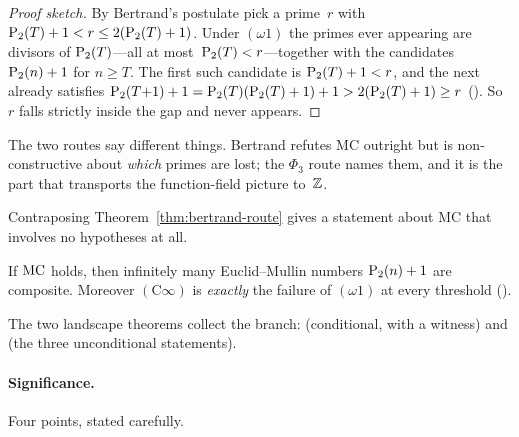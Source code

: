 \begin{proof}[Proof sketch]
By Bertrand's postulate pick a prime~$r$ with
$\mathrm{P}_{2}(T)+1 < r \leq 2(\mathrm{P}_{2}(T)+1)$.  Under $(\omega 1)$ the
primes ever appearing are divisors of $\mathrm{P}_{2}(T)$---all at
most~$\mathrm{P}_{2}(T) < r$---together with the candidates
$\mathrm{P}_{2}(n)+1$ for $n \geq T$.  The first such candidate is
$\mathrm{P}_{2}(T)+1 < r$, and the next already satisfies
$\mathrm{P}_{2}(T{+}1)+1 = \mathrm{P}_{2}(T)(\mathrm{P}_{2}(T)+1)+1 > 2(\mathrm{P}_{2}(T)+1)
\geq r$
().
So~$r$ falls strictly inside the gap and never appears.
\end{proof}

\noindent
The two routes say different things.  Bertrand refutes MC outright but
is non-constructive about \emph{which} primes are lost; the $\Phi_3$
route names them, and it is the part that transports the
function-field picture to~$\mathbb{Z}$.

Contraposing Theorem~\ref{thm:bertrand-route} gives a statement about
MC that involves no hypotheses at all.

\begin{keyresult}
\begin{theorem}
\label{thm:mc-implies-cinfty}
If $\mathrm{MC}$ holds, then infinitely many Euclid--Mullin numbers
$\mathrm{P}_{2}(n)+1$ are composite.  Moreover $(\mathrm{C}\infty)$ is
\emph{exactly} the failure of $(\omega 1)$ at every threshold
().
\end{theorem}
\end{keyresult}

\noindent
The two landscape theorems collect the branch:
(conditional, with a witness) and
(the three unconditional statements).

\paragraph{Significance.}
Four points, stated carefully.


